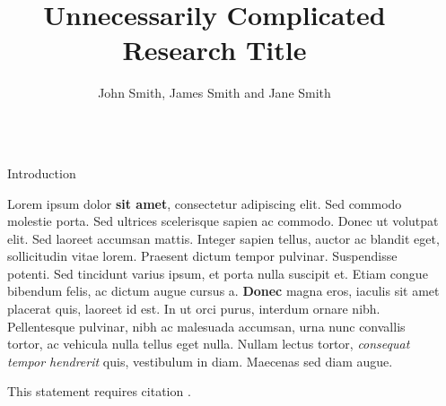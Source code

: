 \documentclass[final]{beamer}
\title{Unnecessarily Complicated Research Title} %
\author{John Smith, James Smith and Jane Smith} %
\institute{Department and University Name} %
\newlength{\sepwid}
\newlength{\onecolwid}
\begin{document}

\setlength{\belowcaptionskip}{2ex} %
\setlength\belowdisplayshortskip{2ex} %

\begin{frame}[t] %

  \begin{columns}[t] %

    \begin{column}{\sepwid}
    \end{column} %

    \begin{column}{\onecolwid} %


      \begin{block}{Introduction}

        Lorem ipsum dolor \textbf{sit amet}, consectetur adipiscing elit. Sed commodo molestie porta. Sed ultrices scelerisque sapien ac commodo. Donec ut volutpat elit. Sed laoreet accumsan mattis. Integer sapien tellus, auctor ac blandit eget, sollicitudin vitae lorem. Praesent dictum tempor pulvinar. Suspendisse potenti. Sed tincidunt varius ipsum, et porta nulla suscipit et. Etiam congue bibendum felis, ac dictum augue cursus a. \textbf{Donec} magna eros, iaculis sit amet placerat quis, laoreet id est. In ut orci purus, interdum ornare nibh. Pellentesque pulvinar, nibh ac malesuada accumsan, urna nunc convallis tortor, ac vehicula nulla tellus eget nulla. Nullam lectus tortor, \textit{consequat tempor hendrerit} quis, vestibulum in diam. Maecenas sed diam augue.

        This statement requires citation \cite{Smith:2012qr}.

      \end{block}



\end{column}
\end{columns}
\end{frame}
\end{document}
